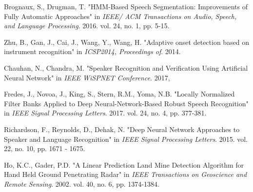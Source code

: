 \documentclass[conference]{IEEEtran}
\begin{document}
\begin{thebibliography}{00}
Brognaux, S., Drugman, T. "HMM-Based Speech Segmentation: Improvements of Fully Automatic Approaches" in \textit{IEEE/ ACM Transactions on Audio, Speech, and Language Processing}. 2016. vol. 24, no. 1, pp. 5-15.

Zhu, B., Gan, J., Cai, J., Wang, Y., Wang, H. "Adaptive onset detection based on instrument recognition" in \textit{ICSP2014, Proceedings of}. 2014.


Chauhan, N., Chandra, M. "Speaker Recognition and Verification Using Artificial Neural Network" in \textit{IEEE WiSPNET Conference}. 2017,

Fredes, J., Novoa, J., King, S., Stern, R.M., Yoma, N.B. "Locally Normalized Filter Banks Applied to Deep Neural-Network-Based Robust Speech Recognition" in \textit{IEEE Signal Processing Letters}. 2017. vol. 24, no. 4, pp. 377-381.

Richardson, F., Reynolds, D., Dehak, N. "Deep Neural Network Approaches to Speaker and Language Recognition" in \textit{IEEE Signal Processing Letters}. 2015. vol. 22, no. 10, pp. 1671 - 1675.

Ho, K.C., Gader, P.D. "A Linear Prediction Land Mine Detection Algorithm for Hand Held Ground Penetrating Radar" in \textit{IEEE Transactions on Geoscience and Remote Sensing}. 2002. vol. 40, no. 6, pp. 1374-1384.


\end{thebibliography}
\end{document}
